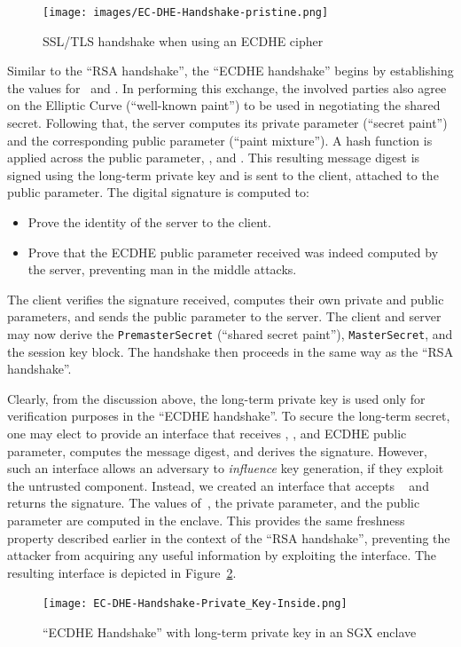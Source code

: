 \documentclass[../../main.tex]{subfiles}
\begin{document}
\begin{figure}[H]
  \centering
  \texttt{[image: images/EC-DHE-Handshake-pristine.png]}
  \caption[``ECDHE handshake'']{SSL/TLS handshake when using an ECDHE
    cipher}
  \label{fig:ecdhe-pristine}
\end{figure}

Similar to the ``RSA handshake'', the ``ECDHE handshake'' begins by
establishing the values for \crandom~and \srandom. In performing this
exchange, the involved parties also agree on the Elliptic Curve
(``well-known paint'') to be used in negotiating the shared secret.
Following that, the server computes its private parameter (``secret
paint'') and the corresponding public parameter (``paint mixture''). A
hash function is applied across the public parameter, \srandom, and
\crandom. This resulting message digest is signed using the long-term
private key and is sent to the client, attached to the public
parameter. The digital signature is computed to:
\begin{itemize}
  \item Prove the identity of the server to the client.
  \item Prove that the ECDHE public parameter received was indeed
    computed by the server, preventing man in the middle attacks. 
\end{itemize}
The client verifies the signature received, computes their own private
and public parameters, and sends the public parameter to the server.
The client and server may now derive the \texttt{PremasterSecret}
(``shared secret paint''), \texttt{MasterSecret}, and the session key
block. The handshake then proceeds in the same way as the ``RSA
handshake''.

Clearly, from the discussion above, the long-term private key is used
only for verification purposes in the ``ECDHE handshake''. To secure
the long-term secret, one may elect to provide an interface that
receives \crandom, \srandom, and ECDHE public parameter, computes the
message digest, and derives the signature. However, such an interface
allows an adversary to \textit{influence} key generation, if they
exploit the untrusted component. Instead, we created an interface that
accepts \crandom~ and returns the signature. The values of~\srandom,
the private parameter, and the public parameter are computed in the
enclave. This provides the same freshness property described earlier
in the context of the ``RSA handshake'', preventing the attacker from
acquiring any useful information by exploiting the interface. The
resulting interface is depicted in Figure~\ref{fig:ecdhe-handshake}.

\begin{figure}[H]
  \centering
  \texttt{[image: EC-DHE-Handshake-Private\_Key-Inside.png]}
  \caption{``ECDHE Handshake'' with long-term private key in an SGX
    enclave}
  \label{fig:ecdhe-handshake}
\end{figure}
\end{document}
